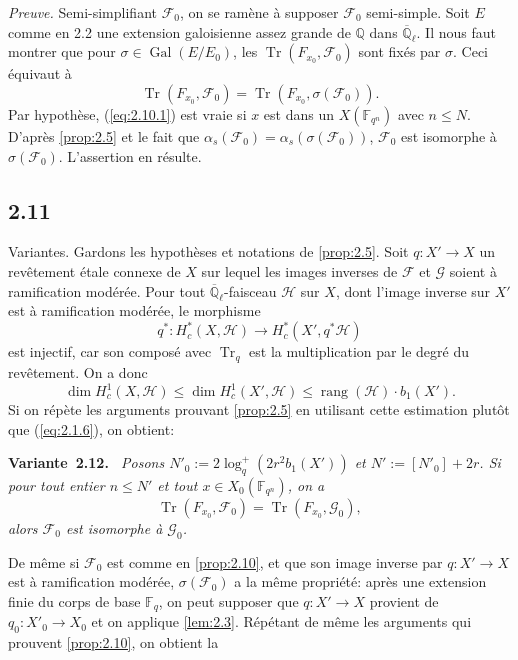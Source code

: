 \documentclass[10pt,a4paper]{article}
\makeatletter
\theoremstyle{plain}
\theoremstyle{definition}
\newenvironment{manualblock}[4]{%
  \par\medskip\noindent\textbf{#1~#2#3.}\def\@currentlabel{#2}\label{#4}\itshape\ }{\par\normalfont\medskip}
\DeclareMathOperator{\Gal}{Gal}
\DeclareMathOperator{\tr}{Tr}
\DeclareMathOperator{\rang}{rang}
\makeatother
\begin{document}
\noindent\textit{Preuve.} Semi-simplifiant $\mathcal{F}_0$, on se ram\`ene \`a supposer $\mathcal{F}_0$ semi-simple. Soit $E$ comme en 2.2 une extension galoisienne assez grande de $\mathbb{Q}$ dans $\overline{\mathbb{Q}}_\ell$. Il nous faut montrer que pour $\sigma \in \Gal(E/E_0)$, les $\tr(F_{x_0}, \mathcal{F}_0)$ sont fix\'es par $\sigma$. Ceci \'equivaut \`a
\begin{equation}\label{eq:2.10.1}
\tr(F_{x_0}, \mathcal{F}_0) = \tr(F_{x_0}, \sigma(\mathcal{F}_0)).
\end{equation}
Par hypoth\`ese, (\ref{eq:2.10.1}) est vraie si $x$ est dans un $X(\mathbb{F}_{q^n})$ avec $n \leq N$. D'apr\`es \ref{prop:2.5} et le fait que $\alpha_s(\mathcal{F}_0) = \alpha_s(\sigma(\mathcal{F}_0))$, $\mathcal{F}_0$ est isomorphe \`a $\sigma(\mathcal{F}_0)$. L'assertion en r\'esulte.

\subsection*{2.11}

Variantes. Gardons les hypoth\`eses et notations de \ref{prop:2.5}. Soit $q: X' \to X$ un rev\^etement \'etale connexe de $X$ sur lequel les images inverses de $\mathcal{F}$ et $\mathcal{G}$ soient \`a ramification mod\'er\'ee. Pour tout $\overline{\mathbb{Q}}_\ell$-faisceau $\mathcal{H}$ sur $X$, dont l'image inverse sur $X'$ est \`a ramification mod\'er\'ee, le morphisme
\[
q^*: H_c^*(X, \mathcal{H}) \to H_c^*(X', q^*\mathcal{H})
\]
est injectif, car son compos\'e avec $\tr_q$ est la multiplication par le degr\'e du rev\^etement. On a donc
\[
\dim H_c^1(X, \mathcal{H}) \leq \dim H_c^1(X', \mathcal{H}) \leq \rang(\mathcal{H}) \cdot b_1(X').
\]
Si on r\'ep\`ete les arguments prouvant \ref{prop:2.5} en utilisant cette estimation plut\^ot que (\ref{eq:2.1.6}), on obtient:

\begin{manualblock}{Variante}{2.12}{}{var:2.12}
Posons $N'_0 := 2\log_q^+(2r^2 b_1(X'))$ et $N' := [N'_0]+2r$. Si pour tout entier $n \leq N'$ et tout $x \in X_0(\mathbb{F}_{q^n})$, on a
\[
\tr(F_{x_0}, \mathcal{F}_0) = \tr(F_{x_0}, \mathcal{G}_0),
\]
alors $\mathcal{F}_0$ est isomorphe \`a $\mathcal{G}_0$.
\end{manualblock}

De m\^eme si $\mathcal{F}_0$ est comme en \ref{prop:2.10}, et que son image inverse par $q: X' \to X$ est \`a ramification mod\'er\'ee, $\sigma(\mathcal{F}_0)$ a la m\^eme propri\'et\'e: apr\`es une extension finie du corps de base $\mathbb{F}_q$, on peut supposer que $q: X' \to X$ provient de $q_0: X'_0 \to X_0$ et on applique \ref{lem:2.3}. R\'ep\'etant de m\^eme les arguments qui prouvent \ref{prop:2.10}, on obtient la
\end{document}
